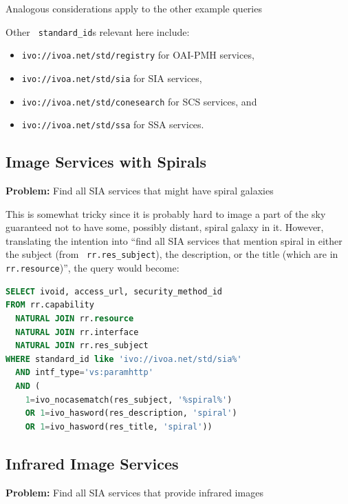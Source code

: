 \documentclass[11pt,a4paper]{ivoa}
\newcommand{\rtent}[1]{\texttt{\color{rtcolor} #1}}
\begin{document}
Analogous considerations apply to the other example queries

Other \rtent{standard\_id}s relevant here include:


\begin{itemize}

\item \texttt{ivo://ivoa.net/std/registry} for OAI-PMH services,{}

\item \texttt{ivo://ivoa.net/std/sia} for SIA services,{}

\item \texttt{ivo://ivoa.net/std/conesearch} for SCS services,
and{}

\item \texttt{ivo://ivoa.net/std/ssa} for SSA services.{}

\end{itemize}

\subsection{Image Services with Spirals}

\textbf{Problem:} Find all SIA services that might have spiral
galaxies

This is somewhat tricky since it is probably hard to image a part
of the sky guaranteed not to have some, possibly distant, spiral galaxy
in it.  However, translating the intention into ``find all SIA services
that mention spiral in either the subject (from 
\rtent{rr.res\_subject}), the description, or the
title (which are in 
\rtent{rr.resource})'', 
the query would become:


\begin{lstlisting}[language=SQL,flexiblecolumns=true]
SELECT ivoid, access_url, security_method_id
FROM rr.capability 
  NATURAL JOIN rr.resource
  NATURAL JOIN rr.interface
  NATURAL JOIN rr.res_subject
WHERE standard_id like 'ivo://ivoa.net/std/sia%'
  AND intf_type='vs:paramhttp'
  AND (
    1=ivo_nocasematch(res_subject, '%spiral%')
    OR 1=ivo_hasword(res_description, 'spiral')
    OR 1=ivo_hasword(res_title, 'spiral'))
\end{lstlisting}


\subsection{Infrared Image Services}

\textbf{Problem:} Find all SIA services that provide infrared
images
\end{document}
